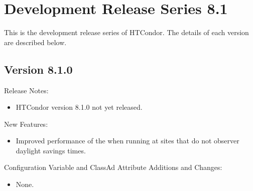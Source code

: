 
\section{\label{sec:History-8-1}Development Release Series 8.1}

This is the development release series of HTCondor.
The details of each version are described below.

\subsection*{\label{sec:New-8-1-0}Version 8.1.0}

\noindent Release Notes:

\begin{itemize}

\item HTCondor version 8.1.0 not yet released.

\end{itemize}


\noindent New Features:

\begin{itemize}

\item Improved performance of the  when running
at sites that do not observer daylight savings times.

\end{itemize}

\noindent Configuration Variable and ClassAd Attribute Additions and Changes:

\begin{itemize}

\item None.

\end{itemize}


